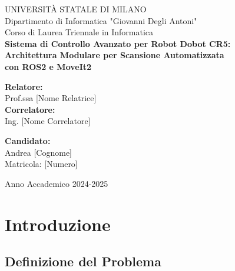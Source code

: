 \documentclass[12pt,a4paper,twoside,openright]{book}
\begin{document}
	
	\begin{titlepage}
		\centering
		\vspace*{1cm}
		
		{\large UNIVERSITÀ STATALE DI MILANO}\\[0.5cm]
		{\large Dipartimento di Informatica "Giovanni Degli Antoni"}\\[0.5cm]
		{\large Corso di Laurea Triennale in Informatica}\\[3cm]
		
		{\Huge\bfseries Sistema di Controllo Avanzato per Robot Dobot CR5:\\[0.5cm]
			Architettura Modulare per Scansione Automatizzata\\[0.5cm]
			con ROS2 e MoveIt2}\\[4cm]
		
		\begin{minipage}{0.4\textwidth}
			\begin{flushleft}
				\large
				\textbf{Relatore:}\\
				Prof.ssa [Nome Relatrice]\\[1cm]
				\textbf{Correlatore:}\\
				Ing. [Nome Correlatore]
			\end{flushleft}
		\end{minipage}
		\hfill
		\begin{minipage}{0.4\textwidth}
			\begin{flushright}
				\large
				\textbf{Candidato:}\\
				Andrea [Cognome]\\
				Matricola: [Numero]
			\end{flushright}
		\end{minipage}
		
		\vfill
		
		{\large Anno Accademico 2024-2025}
		
	\end{titlepage}
	
	\tableofcontents
	\cleardoublepage
	
	
	\chapter{Introduzione}
	\section{Definizione del Problema}
\end{document}
